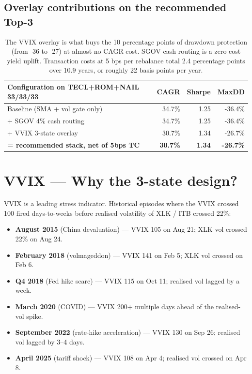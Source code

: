 \documentclass[11pt,a4paper]{article}
\begin{document}
\subsection{Overlay contributions on the recommended Top-3}

\begin{table}[H]
\centering
\small
\begin{tabular}{lrrr}
\toprule
\textbf{Configuration on TECL+ROM+NAIL 33/33/33} & \textbf{CAGR} & \textbf{Sharpe} & \textbf{MaxDD} \\
\midrule
Baseline (SMA + vol gate only) & 34.7\% & 1.25 & -36.4\% \\
\quad + SGOV 4\% cash routing            & 34.7\% & 1.25 & -36.4\% \\
\quad + VVIX 3-state overlay             & 30.7\% & 1.34 & -26.7\% \\
\rowcolor{green!10} \quad \textbf{= recommended stack, net of 5bps TC} & \textbf{30.7\%} & \textbf{1.34} & \textbf{-26.7\%} \\
\bottomrule
\end{tabular}
\caption{The VVIX overlay is what buys the 10 percentage points of drawdown protection (from -36 to -27) at almost no CAGR cost. SGOV cash routing is a zero-cost yield uplift. Transaction costs at 5 bps per rebalance total 2.4 percentage points over 10.9 years, or roughly 22 basis points per year.}
\end{table}

\section{VVIX --- Why the 3-state design?}

VVIX is a leading stress indicator. Historical episodes where the VVIX crossed 100 fired days-to-weeks before realised volatility of XLK / ITB crossed 22\%:

\begin{itemize}[noitemsep]
    \item \textbf{August 2015} (China devaluation) --- VVIX 105 on Aug 21; XLK vol crossed 22\% on Aug 24.
    \item \textbf{February 2018} (volmageddon) --- VVIX 141 on Feb 5; XLK vol crossed on Feb 6.
    \item \textbf{Q4 2018} (Fed hike scare) --- VVIX 115 on Oct 11; realised vol lagged by a week.
    \item \textbf{March 2020} (COVID) --- VVIX 200+ multiple days ahead of the realised-vol spike.
    \item \textbf{September 2022} (rate-hike acceleration) --- VVIX 130 on Sep 26; realised vol lagged by 3--4 days.
    \item \textbf{April 2025} (tariff shock) --- VVIX 108 on Apr 4; realised vol crossed on Apr 8.
\end{itemize}
\end{document}
